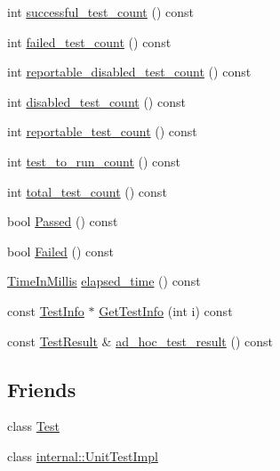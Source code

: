 \begin{DoxyCompactItemize}
int \hyperlink{classtesting_1_1_test_case_a8fb3974ccb5242ad9d1d633d53c0f730}{successful\-\_\-test\-\_\-count} () const 
\item 
int \hyperlink{classtesting_1_1_test_case_ae74e7a2e75d07f9feca2c3384604cb01}{failed\-\_\-test\-\_\-count} () const 
\item 
int \hyperlink{classtesting_1_1_test_case_a4ec19c0058282562c0cc2c0e87d4b211}{reportable\-\_\-disabled\-\_\-test\-\_\-count} () const 
\item 
int \hyperlink{classtesting_1_1_test_case_ac1e3cd2b598f19ce10e42b3421508a9e}{disabled\-\_\-test\-\_\-count} () const 
\item 
int \hyperlink{classtesting_1_1_test_case_a7693150fa71d460a19b291ed6f5c18bd}{reportable\-\_\-test\-\_\-count} () const 
\item 
int \hyperlink{classtesting_1_1_test_case_a47de0cf87858370388275c9d995f1ff4}{test\-\_\-to\-\_\-run\-\_\-count} () const 
\item 
int \hyperlink{classtesting_1_1_test_case_ac7b2ed22822735b7b9ae2740162332c9}{total\-\_\-test\-\_\-count} () const 
\item 
bool \hyperlink{classtesting_1_1_test_case_ad093a04334d7eb8d707a7f1a321b040f}{Passed} () const 
\item 
bool \hyperlink{classtesting_1_1_test_case_a5c0922d310f860e78cca7e215f2fa0e4}{Failed} () const 
\item 
\hyperlink{namespacetesting_a992de1d091ce660f451d1e8b3ce30fd6}{Time\-In\-Millis} \hyperlink{classtesting_1_1_test_case_a80f163d2826ba8586fffb41e8d686727}{elapsed\-\_\-time} () const 
\item 
const \hyperlink{classtesting_1_1_test_info}{Test\-Info} $\ast$ \hyperlink{classtesting_1_1_test_case_a17dfa2a9fde64f5add3615e9426e81e1}{Get\-Test\-Info} (int i) const 
\item 
const \hyperlink{classtesting_1_1_test_result}{Test\-Result} \& \hyperlink{classtesting_1_1_test_case_a3993481a8f0c2253653b5e1ec5934432}{ad\-\_\-hoc\-\_\-test\-\_\-result} () const 
\end{DoxyCompactItemize}
\subsection*{Friends}
\begin{DoxyCompactItemize}
\item 
class \hyperlink{classtesting_1_1_test_case_ab085d1bf4cff8b1045750706b11f8662}{Test}
\item 
class \hyperlink{classtesting_1_1_test_case_aa684cc13a8f91b00c0c9ce41ec7474eb}{internal\-::\-Unit\-Test\-Impl}
\end{DoxyCompactItemize}


